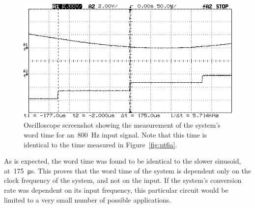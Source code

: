 \begin{figure}[H]
	\centering
	\includegraphics[width=.6\textwidth]{img/shot/pt6b_wordtime.png}
	\parbox{.6\textwidth}{
	\caption[Word Time Measurement --- \SI{800}{\hertz} Sinusoid]{Oscilloscope screenshot showing the measurement of the system's word time for an~\SI{800}{\hertz} input signal.  Note that this time is identical to the time measured in Figure~\ref{fig:pt6a}.}
	\label{fig:pt6b}}
\end{figure}
%
As is expected, the word time was found to be identical to the slower sinusoid, at~\SI{175}{\micro\second}.  This proves that the word time of the system is dependent only on the clock frequency of the system, and not on the input.  If the system's conversion rate was dependent on its input frequency, this particular circuit would be limited to a very small number of possible applications.

